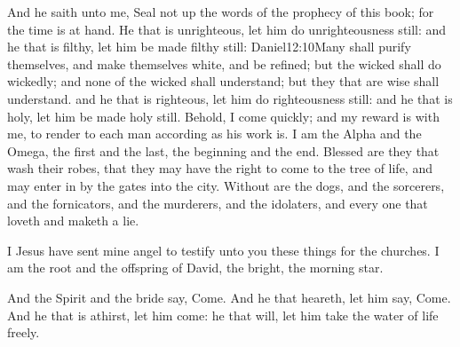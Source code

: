 And he saith unto me, Seal not up the words of the prophecy of this book; for the time is at hand. 
He that is unrighteous, let him do unrighteousness still: and he that is filthy, let him be made filthy still:%
					{Daniel}{12:10}{Many shall purify themselves, and make themselves white, and be refined; but the wicked shall do wickedly; and none of the wicked shall understand; but they that are wise shall understand.} %
and he that is righteous, let him do righteousness still: and he that is holy, let him be made holy still.%
Behold, I come quickly; and my reward is with me, to render to each man according as his work is. 
I am the Alpha and the Omega, the first and the last, the beginning and the end. 
Blessed are they that wash their robes, that they may have the right to come to the tree of life, and may enter in by the gates into the city.%
 Without are the dogs, and the sorcerers, and the fornicators, and the murderers, and the idolaters, and every one that loveth and maketh a lie.

I Jesus have sent mine angel%
to testify unto you these things for the churches. I am the root and the offspring of David, the bright, the morning star.%

And the Spirit and the bride say, Come. And he that heareth, let him say, Come. And he that is athirst, let him come: he that will, let him take the water of life freely.%

